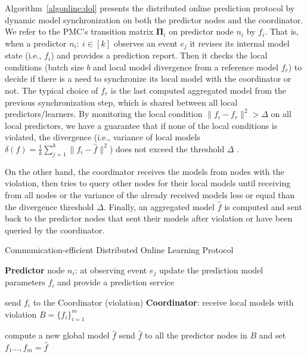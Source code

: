 \par Algorithm~\ref{algonline:dol} presents the distributed online prediction protocol by dynamic model synchronization on both the predictor nodes and the coordinator. We refer to the PMC's transition matrix $\boldsymbol{\Pi}_i$ on predictor node $n_i$ by $f_i$. That is, when a predictor $n_i:\ i \in[k]$ observes an event $e_j$ it revises its internal model state (i.e., $f_i$) and provides a prediction report. Then it checks the local conditions  (batch size $b$ and local model divergence from a reference model $f_r$) to decide if there is a need to synchronize its local model with the coordinator or not. The typical choice of $f_r$ is the last computed aggregated model from the previous synchronization step, which is shared between all local predictors/learners. By monitoring the local condition $\|f_i - f_r\|^2 > \Delta$ on all local predictors, we have a guarantee that if none of the local conditions is violated, the divergence (i.e., variance of local models $\delta(f)=\frac{1}{k} \sum_{j=1}^{k}\|f_i - \hat{f}\|^2$) does not exceed the threshold $\Delta$ \cite{kamp2014communication}. 



\par On the other hand, the coordinator receives the models from nodes with the violation, then tries to query other nodes for their local models until receiving from all nodes or the variance of the already received models less or equal than the divergence threshold  $\Delta$. Finally, an aggregated model $\hat{f}$ is computed and sent back to the predictor nodes that sent their models after violation or have been queried by the coordinator.

\begin{algorithm}
	\caption{Communication-efficient Distributed Online Learning Protocol } 
	\begin{algorithmic}[1] 
		\Statex  \Indm  \textbf{Predictor} node $n_i$: at observing event $e_j$
		\Statex \Indp update the prediction model parameters $f_i$ and provide a prediction service 

		\Statex {}  
		\Statex send  $f_i$ to the Coordinator (violation) 
		\Statex \Indm \textbf{Coordinator}:
		\Statex \Indp receive local models with violation
		 $B=\{f_i\}_{i=1}^m$
	
	
		\Statex {}
        \Statex
		\Statex compute a new global model $\hat{f}$ 
		\Statex send $\hat{f}$ to all the predictor nodes in $B$ and set $f_{1}\dots, f_{m}=\hat{f} $ 
		\Statex {}
	\end{algorithmic}
	\label{algonline:dol}
\end{algorithm}



